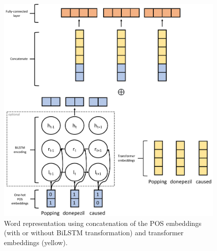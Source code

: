 \documentclass[11pt]{article}
\begin{document}
\begin{figure}[!htbp]
    \centering
    \includegraphics[width=\columnwidth]{figures/word_arch.pdf}
    \caption{Word representation using concatenation of the POS embeddings (with or without BiLSTM transformation) and transformer embeddings (yellow).}
    \label{fig:task2_word}
\end{figure}
%
%
%
\end{document}
